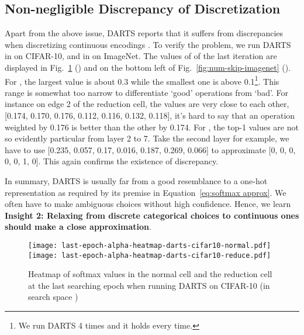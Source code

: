 \documentclass[runningheads]{llncs}
\begin{document}
\subsection{Non-negligible Discrepancy of Discretization}\label{sec:problem of discrepancy}
Apart from the above issue, DARTS reports that it suffers from discrepancies when discretizing continuous encodings \cite{liu2018darts}. 
To verify the problem, we run DARTS in  on CIFAR-10, and in  on ImageNet. The values of  of the last iteration are displayed in Fig.~\ref{fig:alpha-heatmap-darts-cifar-imagenet} () and on the bottom left of Fig.~\ref{fig:num-skip-imagenet} (). For ,  the largest value is about 0.3 while the smallest one is above 0.1\footnote{We run DARTS 4 times and it holds every time.}. This range is somewhat too narrow to differentiate `good' operations from `bad'. For instance on edge 2 of the reduction cell, the values are very close to each other, [0.174, 0.170, 0.176, 0.112, 0.116, 0.132, 0.118], it's hard to say that an operation weighted by 0.176 is better than the other by 0.174.  
For , the top-1 values are not so evidently particular from layer 2 to 7. Take the second layer for example, we have to use [0.235, 0.057, 0.17,  0.016, 0.187, 0.269, 0.066] to approximate [0, 0, 0, 0, 0, 1, 0]. This again confirms the existence of discrepancy.



In summary, DARTS is usually far from a good resemblance to a one-hot representation as required by its premise in Equation~\ref{eq:softmax approx}. We often have to make ambiguous choices without high confidence. Hence, we learn 
\textbf{Insight 2: Relaxing from discrete categorical choices to continuous ones should make a close approximation}.

















\begin{figure}[ht]
	\centering
	\texttt{[image: last-epoch-alpha-heatmap-darts-cifar10-normal.pdf]}
	\texttt{[image: last-epoch-alpha-heatmap-darts-cifar10-reduce.pdf]}
\caption{Heatmap of softmax values in the normal cell and the reduction cell at the last searching epoch when running DARTS on CIFAR-10 (in search space )}
	\label{fig:alpha-heatmap-darts-cifar-imagenet}
\end{figure}
\end{document}
